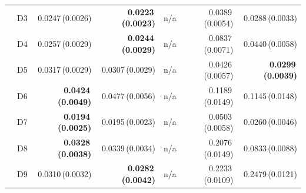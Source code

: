 \begin{table}[htbp]
\begin{tabular}{@{}llrrrrr@{}}
 & D3 & 0.0247\,(0.0026) & \textbf{0.0223\,(0.0023)} & n/a & 0.0389\,(0.0054) & 0.0288\,(0.0033) \\
 & D4 & 0.0257\,(0.0029) & \textbf{0.0244\,(0.0029)} & n/a & 0.0837\,(0.0071) & 0.0440\,(0.0058) \\
 & D5 & 0.0317\,(0.0029) & 0.0307\,(0.0029) & n/a & 0.0426\,(0.0057) & \textbf{0.0299\,(0.0039)} \\
 & D6 & \textbf{0.0424\,(0.0049)} & 0.0477\,(0.0056) & n/a & 0.1189\,(0.0149) & 0.1145\,(0.0148) \\
 & D7 & \textbf{0.0194\,(0.0025)} & 0.0195\,(0.0023) & n/a & 0.0503\,(0.0058) & 0.0260\,(0.0046) \\
 & D8 & \textbf{0.0328\,(0.0038)} & 0.0339\,(0.0034) & n/a & 0.2076\,(0.0149) & 0.0833\,(0.0088) \\
 & D9 & 0.0310\,(0.0032) & \textbf{0.0282\,(0.0042)} & n/a & 0.2233\,(0.0109) & 0.2479\,(0.0121) \\
\bottomrule
\end{tabular}
\end{table}

